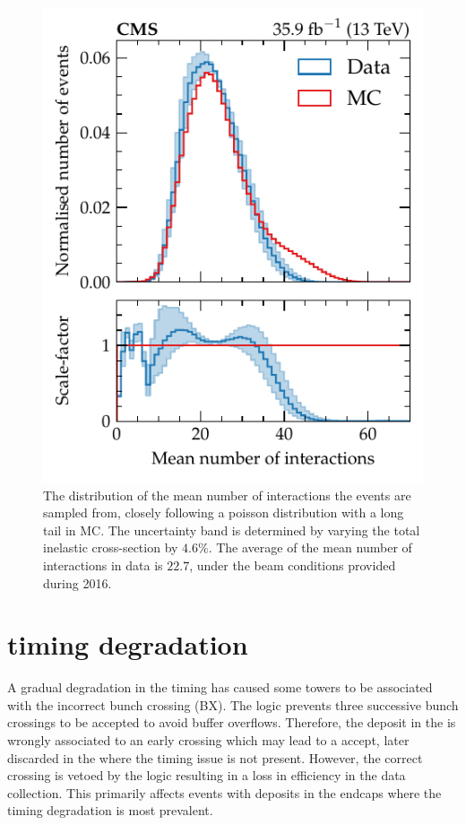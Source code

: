 \begin{figure}[htb]
    \centering
    \includegraphics{chapters/041_corrections/images/pileup/pileup.pdf}
    \caption[Pileup distribution in data and simulation for reweighting.]{
         The distribution of the mean number of interactions the events are sampled from, closely following a poisson distribution with a long tail in MC. The uncertainty band is determined by varying the total inelastic cross-section by $4.6\%$. The average of the mean number of interactions in data is $22.7$, under the \LHC beam conditions provided during 2016.
    }
    \label{fig:pu-reweighting}
\end{figure}


\section{\ECAL timing degradation}

A gradual degradation in the \ECAL timing has caused some \HWT \ECAL towers to be associated with the incorrect bunch crossing (BX). The \HWT logic prevents three successive bunch crossings to be accepted to avoid buffer overflows. Therefore, the deposit in the \ECAL is wrongly associated to an early crossing which may lead to a \HWT accept, later discarded in the \SWT where the timing issue is not present. However, the correct crossing is vetoed by the \HWT logic resulting in a loss in efficiency in the data collection. This primarily affects events with \ECAL deposits in the endcaps where the timing degradation is most prevalent.

